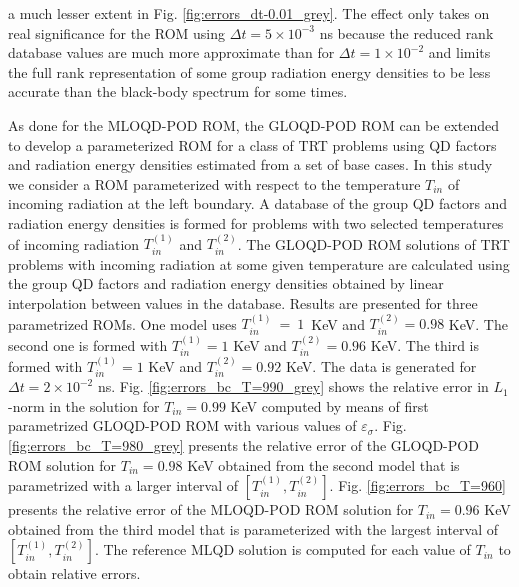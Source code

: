 a much lesser extent in Fig. \ref{fig:errors_dt-0.01_grey}. The effect only takes on real significance for the ROM using $\Delta t \! = \! 5\! \times  \! 10^{-3}$ ns because the reduced rank database values are much more approximate than for $\Delta t \! = \! 1\! \times  \! 10^{-2}$ and limits the full rank representation of some group radiation energy densities to be less accurate than the black-body spectrum for some times.

	\ind As done for the MLOQD-POD ROM, the GLOQD-POD ROM can be extended to develop a parameterized ROM for a class of TRT problems using QD factors and radiation energy densities estimated from a set of base cases. In this study we consider a ROM parameterized with respect to the temperature $T_{in}$ of incoming radiation at the left boundary. A database of the group QD factors and radiation energy densities is formed for problems with two selected temperatures of incoming radiation  $T_{in}^{(1)}$ and $T_{in}^{(2)}$. The GLOQD-POD ROM solutions of TRT problems with incoming radiation at some given temperature are calculated using the group QD factors and radiation energy densities obtained by linear interpolation between values in the database. Results are presented for three parametrized ROMs. One model uses $T_{in}^{(1)}~=~1$~KeV and $T_{in}^{(2)}=0.98$ KeV. The second one is formed with  $T_{in}^{(1)}=1$ KeV and $T_{in}^{(2)}=0.96$ KeV. The third is formed with  $T_{in}^{(1)}=1$ KeV and $T_{in}^{(2)}=0.92$ KeV. The data is generated for $\Delta t = 2\times10^{-2}$ ns. Fig. \ref{fig:errors_bc_T=990_grey} shows the relative error in $L_1$-norm in the solution for $T_{in}=0.99$ KeV computed by means of first parametrized GLOQD-POD ROM with various values of $\varepsilon_{\sigma}$. Fig. \ref{fig:errors_bc_T=980_grey} presents the relative error of the GLOQD-POD ROM solution  for $T_{in}= 0.98$ KeV obtained from the second model that is parametrized with a larger interval of  $[T_{in}^{(1)},T_{in}^{(2)}]$. Fig. \ref{fig:errors_bc_T=960} presents the relative error of the MLOQD-POD ROM solution  for $T_{in}= 0.96$ KeV obtained from the third model that is parameterized with the largest interval of  $[T_{in}^{(1)},T_{in}^{(2)}]$. The reference MLQD solution is computed for each value of $T_{in}$ to obtain relative errors.
	
